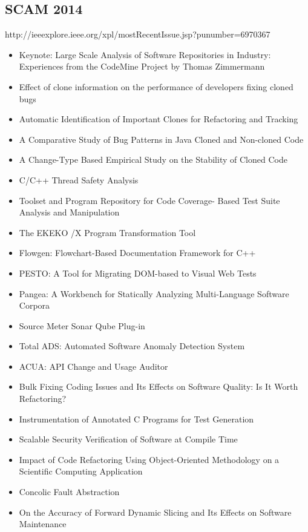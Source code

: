 \subsection{SCAM 2014}

http://ieeexplore.ieee.org/xpl/mostRecentIssue.jsp?punumber=6970367

{\small
\begin{itemize}[itemsep=-1ex]
  \item Keynote: Large Scale Analysis of Software Repositories in Industry: Experiences from the CodeMine Project by Thomas Zimmermann
  \item Effect of clone information on the performance of developers fixing cloned bugs
  \item Automatic Identification of Important Clones for Refactoring and Tracking
  \item A Comparative Study of Bug Patterns in Java Cloned and Non-cloned Code
  \item A Change-Type Based Empirical Study on the Stability of Cloned Code
  \item C/C++ Thread Safety Analysis
  \item Toolset and Program Repository for Code Coverage- Based Test Suite Analysis and Manipulation
  \item The EKEKO /X Program Transformation Tool
  \item Flowgen: Flowchart-Based Documentation Framework for C++
  \item PESTO: A Tool for Migrating DOM-based to Visual Web Tests
  \item Pangea: A Workbench for Statically Analyzing Multi-Language Software Corpora
  \item Source Meter Sonar Qube Plug-in
  \item Total ADS: Automated Software Anomaly Detection System
  \item ACUA: API Change and Usage Auditor
  \item Bulk Fixing Coding Issues and Its Effects on Software Quality: Is It Worth Refactoring?
  \item Instrumentation of Annotated C Programs for Test Generation
  \item Scalable Security Verification of Software at Compile Time
  \item Impact of Code Refactoring Using Object-Oriented Methodology on a Scientific Computing Application
  \item Concolic Fault Abstraction
  \item On the Accuracy of Forward Dynamic Slicing and Its Effects on Software Maintenance

\end{itemize}}
